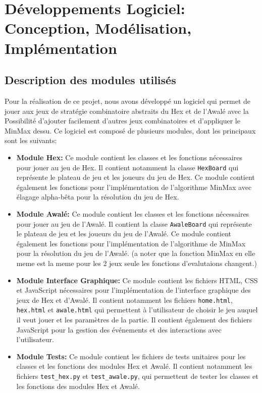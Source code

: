 \section{Développements Logiciel: Conception, Modélisation, Implémentation} 
\subsection{Description des modules utilisés}
Pour la réalisation de ce projet, nous avons développé un logiciel qui permet de jouer
aux jeux de stratégie combinatoire abstraits du Hex et de l'Awalé avec la Possibilité
d'ajouter facilement d'autres jeux combinatoires et d'appliquer le MinMax dessu. Ce logiciel est
composé de plusieurs modules, dont les principaux sont les suivants:

\begin{itemize}
    \item \textbf{Module Hex:} Ce module contient les classes et les fonctions nécessaires
    pour jouer au jeu de Hex. Il contient notamment la classe \texttt{HexBoard} qui 
    représente le plateau de jeu et les joueurs du jeu de Hex. Ce module contient également 
    les fonctions pour l'implémentation de l'algorithme MinMax avec élagage alpha-bêta pour 
    la résolution du jeu de Hex.
    
    \item \textbf{Module Awalé:} Ce module contient les classes et les fonctions nécessaires
    pour jouer au jeu de l'Awalé. Il contient la classe \texttt{AwaleBoard} qui représente le
    plateau de jeu et les joueurs du jeu de l'Awalé. Ce module contient également les fonctions
    pour l'implémentation de l'algorithme de MinMax pour la résolution du jeu de l'Awalé. (a noter que la fonction MinMax
    en elle meme est la meme pour les 2 jeux seule les fonctions d'evalutaions changent.)
    
    \item \textbf{Module Interface Graphique:} Ce module contient les fichiers HTML, CSS et
    JavaScript nécessaires pour l'implémentation de l'interface graphique des jeux de Hex et
    d'Awalé. Il contient notamment les fichiers \texttt{home.html}, \texttt{hex.html} et
    \texttt{awale.html} qui permettent à l'utilisateur de choisir le jeu auquel il veut jouer
    et les paramètres de la partie. Il contient également des fichiers JavaScript pour la
    gestion des événements et des interactions avec l'utilisateur.
    
    \item \textbf{Module Tests:} Ce module contient les fichiers de tests unitaires pour les
    classes et les fonctions des modules Hex et Awalé. Il contient notamment les fichiers
    \texttt{test\_hex.py} et \texttt{test\_awale.py}, qui permettent de tester les classes
    et les fonctions des modules Hex et Awalé.
\end{itemize}


